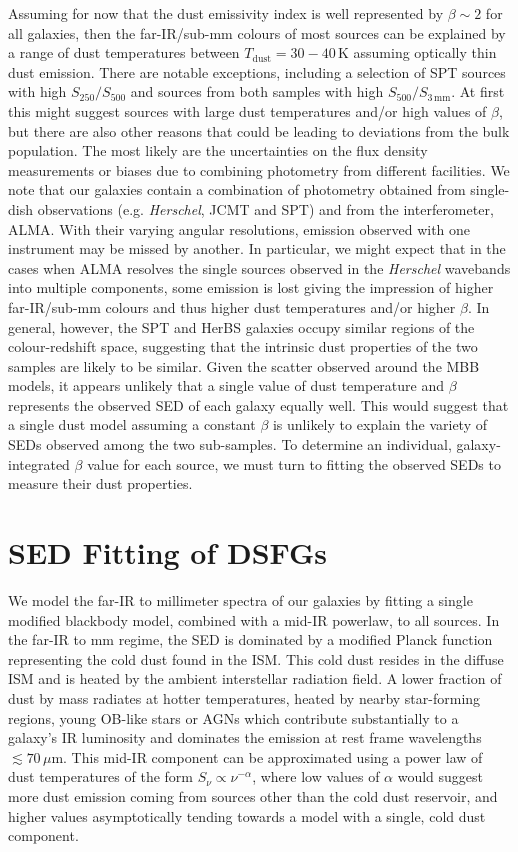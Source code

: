 Assuming for now that the dust emissivity index is well represented by $\beta \sim 2$ for all galaxies, then the far-IR/sub-mm colours of most sources can be explained by a range of dust temperatures between $T_{\textrm{dust}} = 30 - 40\,$K assuming optically thin dust emission. There are notable exceptions, including a selection of SPT sources with high $S_{250}/S_{500}$ and sources from both samples with high $S_{500}/S_{3\,\textrm{mm}}$. At first this might suggest sources with large dust temperatures and/or high values of $\beta$, but there are also other reasons that could be leading to deviations from the bulk population. The most likely are the uncertainties on the flux density measurements or biases due to combining photometry from different facilities. We note that our galaxies contain a combination of photometry obtained from single-dish observations (e.g. \textit{Herschel}, JCMT and SPT) and from the interferometer, ALMA. With their varying angular resolutions, emission observed with one instrument may be missed by another. In particular, we might expect that in the cases when ALMA resolves the single sources observed in the \textit{Herschel} wavebands into multiple components, some emission is lost giving the impression of higher far-IR/sub-mm colours and thus higher dust temperatures and/or higher $\beta$. In general, however, the SPT and HerBS galaxies occupy similar regions of the colour-redshift space, suggesting that the intrinsic dust properties of the two samples are likely to be similar. Given the scatter observed around the MBB models, it appears unlikely that a single value of dust temperature and $\beta$ represents the observed SED of each galaxy equally well. This would suggest that a single dust model assuming a constant $\beta$ is unlikely to explain the variety of SEDs observed among the two sub-samples. To determine an individual, galaxy-integrated $\beta$ value for each source, we must turn to fitting the observed SEDs to measure their dust properties.

\section{SED Fitting of DSFGs}
\label{sec:sed_fitting}

We model the far-IR to millimeter spectra of our galaxies by fitting a single modified blackbody model, combined with a mid-IR powerlaw, to all sources. In the far-IR to mm regime, the SED is dominated by a modified Planck function representing the cold dust found in the ISM. This cold dust resides in the diffuse ISM and is heated by the ambient interstellar radiation field. A lower fraction of dust by mass radiates at hotter temperatures, heated by nearby star-forming regions, young OB-like stars or AGNs which contribute substantially to a galaxy's IR luminosity and dominates the emission at rest frame wavelengths $\lesssim 70\,\mu$m. This mid-IR component can be approximated using a power law of dust temperatures of the form $S_\nu \propto \nu^{-\alpha}$, where low values of $\alpha$ would suggest more dust emission coming from sources other than the cold dust reservoir, and higher values asymptotically tending towards a model with a single, cold dust component.

